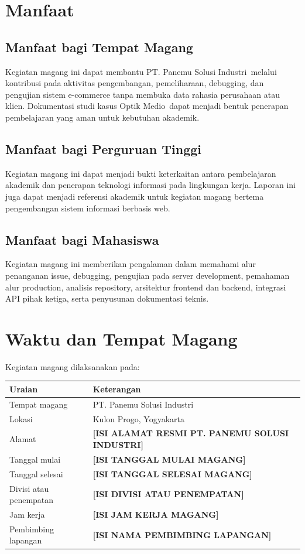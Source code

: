 \documentclass[12pt,a4paper,oneside]{report}
\newcommand{\placeholder}[1]{\textbf{[#1]}}
\newcommand{\tempatmagang}{PT. Panemu Solusi Industri}
\newcommand{\lokasimagang}{Kulon Progo, Yogyakarta}
\newcommand{\alamatmagang}{\placeholder{ISI ALAMAT RESMI PT. PANEMU SOLUSI INDUSTRI}}
\newcommand{\proyekstudi}{Optik Medio}
\begin{document}
\section{Manfaat}

\subsection{Manfaat bagi Tempat Magang}

Kegiatan magang ini dapat membantu \tempatmagang\ melalui kontribusi pada aktivitas pengembangan, pemeliharaan, debugging, dan pengujian sistem e-commerce tanpa membuka data rahasia perusahaan atau klien. Dokumentasi studi kasus \proyekstudi\ dapat menjadi bentuk penerapan pembelajaran yang aman untuk kebutuhan akademik.

\subsection{Manfaat bagi Perguruan Tinggi}

Kegiatan magang ini dapat menjadi bukti keterkaitan antara pembelajaran akademik dan penerapan teknologi informasi pada lingkungan kerja. Laporan ini juga dapat menjadi referensi akademik untuk kegiatan magang bertema pengembangan sistem informasi berbasis web.

\subsection{Manfaat bagi Mahasiswa}

Kegiatan magang ini memberikan pengalaman dalam memahami alur penanganan issue, debugging, pengujian pada server development, pemahaman alur production, analisis repository, arsitektur frontend dan backend, integrasi API pihak ketiga, serta penyusunan dokumentasi teknis.

\section{Waktu dan Tempat Magang}

Kegiatan magang dilaksanakan pada:

\begin{longtable}{p{}p{}}
\toprule
Uraian & Keterangan\\
\midrule
Tempat magang & \tempatmagang\\
Lokasi & \lokasimagang\\
Alamat & \alamatmagang\\
Tanggal mulai & \placeholder{ISI TANGGAL MULAI MAGANG}\\
Tanggal selesai & \placeholder{ISI TANGGAL SELESAI MAGANG}\\
Divisi atau penempatan & \placeholder{ISI DIVISI ATAU PENEMPATAN}\\
Jam kerja & \placeholder{ISI JAM KERJA MAGANG}\\
Pembimbing lapangan & \placeholder{ISI NAMA PEMBIMBING LAPANGAN}\\
\bottomrule
\end{longtable}
\end{document}
